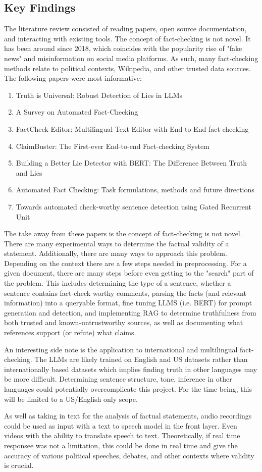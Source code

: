 \documentclass[11pt,letterpaper]{article}
\newcommand{\findings}[1]{
    \subsection*{Key Findings}
    #1
}
\begin{document}
\findings{
The literature review consisted of reading papers, open source documentation, and interacting with existing tools. The concept of fact-checking is not novel. It has been around since 2018, which coincides with the popularity rise of "fake news" and misinformation on social media platforms. As such, many fact-checking methods relate to political contexts, Wikipedia, and other trusted data sources. The following papers were most informative:
\begin{enumerate}
    \item Truth is Universal: Robust Detection of Lies in LLMs
    \item A Survey on Automated Fact-Checking
    \item FactCheck Editor: Multilingual Text Editor with End-to-End fact-checking
    \item ClaimBuster: The First-ever End-to-end Fact-checking System
    \item Building a Better Lie Detector with BERT: The Difference Between Truth and Lies
    \item Automated Fact Checking: Task formulations, methods and future directions
    \item Towards automated check-worthy sentence detection using Gated Recurrent Unit
\end{enumerate}

The take away from these papers is the concept of fact-checking is not novel. There are many experimental ways to determine the factual validity of a statement. Additionally, there are many ways to approach this problem. Depending on the context there are a few steps needed in preprocessing. For a given document, there are many steps before even getting to the "search" part of the problem. This includes determining the type of a sentence, whether a sentence contains fact-check worthy comments, parsing the facts (and relevant information) into a queryable format, fine tuning LLMS (i.e. BERT) for prompt generation and detection, and implementing RAG to determine truthfulness from both trusted and known-untrustworthy sources, as well as documenting what references support (or refute) what claims. 

An interesting side note is the application to international and multilingual fact-checking. The LLMs are likely trained on English and US datasets rather than internationally based datasets which implies finding truth in other languages may be more difficult. Determining sentence structure, tone, inference in other languages could potentially overcomplicate this project. For the time being, this will be limited to a US/English only scope. 

As well as taking in text for the analysis of factual statements, audio recordings could be used as input with a text to speech model in the front layer. Even videos with the ability to translate speech to text. Theoretically, if real time responsee was not a limitation, this could be done in real time and give the accuracy of various political speeches, debates, and other contexts where validity is crucial.
}
\end{document}

